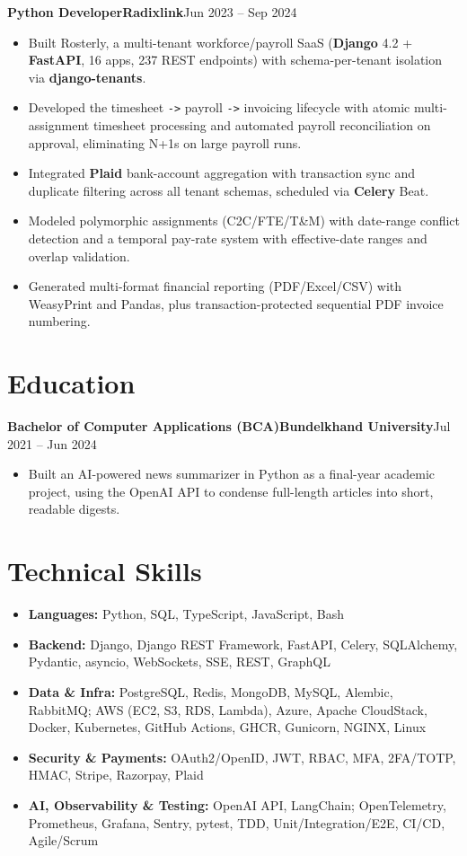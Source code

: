 \documentclass[11pt,a4paper]{article}
\newcommand{\entry}[3]{%
  \vspace{4.5pt}\noindent\textbf{#1}\hfill\textbf{#2}\hfill{\color{subtlegray}#3}\par\vspace{2pt}}
\begin{document}
\entry{Python Developer}{Radixlink}{Jun 2023 -- Sep 2024}
\begin{itemize}
  \item Built Rosterly, a multi-tenant workforce/payroll SaaS (\textbf{Django} 4.2
        + \textbf{FastAPI}, 16 apps, 237 REST endpoints) with schema-per-tenant
        isolation via \textbf{django-tenants}.
  \item Developed the timesheet \texttt{->} payroll \texttt{->} invoicing
        lifecycle with atomic multi-assignment timesheet processing and automated
        payroll reconciliation on approval, eliminating N+1s on large payroll runs.
  \item Integrated \textbf{Plaid} bank-account aggregation with transaction sync
        and duplicate filtering across all tenant schemas, scheduled via
        \textbf{Celery} Beat.
  \item Modeled polymorphic assignments (C2C/FTE/T\&M) with date-range conflict
        detection and a temporal pay-rate system with effective-date ranges and
        overlap validation.
  \item Generated multi-format financial reporting (PDF/Excel/CSV) with WeasyPrint
        and Pandas, plus transaction-protected sequential PDF invoice numbering.
\end{itemize}

\section{Education}
\entry{Bachelor of Computer Applications (BCA)}{Bundelkhand University}{Jul 2021 -- Jun 2024}
\begin{itemize}
  \item Built an AI-powered news summarizer in Python as a final-year academic
        project, using the OpenAI API to condense full-length articles into short,
        readable digests.
\end{itemize}

\section{Technical Skills}
\begin{itemize}
  \item \textbf{Languages:} Python, SQL, TypeScript, JavaScript, Bash
  \item \textbf{Backend:} Django, Django REST Framework, FastAPI, Celery,
        SQLAlchemy, Pydantic, asyncio, WebSockets, SSE, REST, GraphQL
  \item \textbf{Data \& Infra:} PostgreSQL, Redis, MongoDB, MySQL, Alembic,
        RabbitMQ; AWS (EC2, S3, RDS, Lambda), Azure, Apache CloudStack, Docker,
        Kubernetes, GitHub Actions, GHCR, Gunicorn, NGINX, Linux
  \item \textbf{Security \& Payments:} OAuth2/OpenID, JWT, RBAC, MFA, 2FA/TOTP,
        HMAC, Stripe, Razorpay, Plaid
  \item \textbf{AI, Observability \& Testing:} OpenAI API, LangChain;
        OpenTelemetry, Prometheus,
        Grafana, Sentry, pytest, TDD, Unit/Integration/E2E, CI/CD, Agile/Scrum
\end{itemize}
\end{document}
